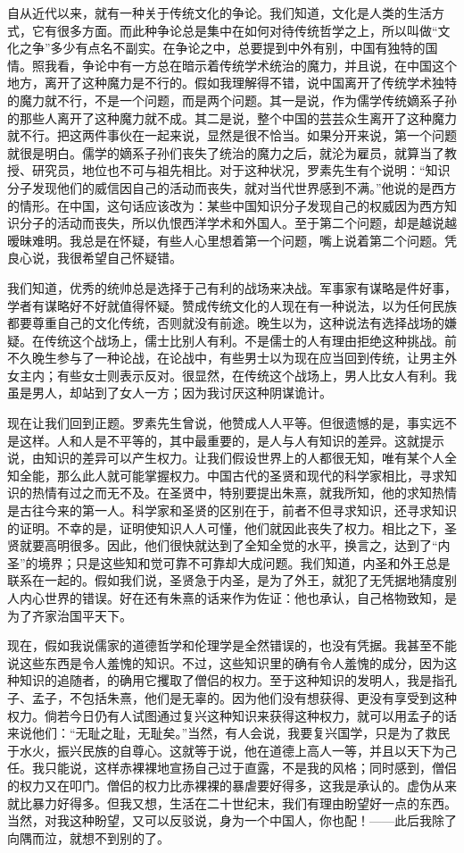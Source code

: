 自从近代以来，就有一种关于传统文化的争论。我们知道，文化是人类的生活方式，它有很多方面。而此种争论总是集中在如何对待传统哲学之上，所以叫做“文化之争”多少有点名不副实。在争论之中，总要提到中外有别，中国有独特的国情。照我看，争论中有一方总在暗示着传统学术统治的魔力，并且说，在中国这个地方，离开了这种魔力是不行的。假如我理解得不错，说中国离开了传统学术独特的魔力就不行，不是一个问题，而是两个问题。其一是说，作为儒学传统嫡系子孙的那些人离开了这种魔力就不成。其二是说，整个中国的芸芸众生离开了这种魔力就不行。把这两件事伙在一起来说，显然是很不恰当。如果分开来说，第一个问题就很是明白。儒学的嫡系子孙们丧失了统治的魔力之后，就沦为雇员，就算当了教授、研究员，地位也不可与祖先相比。对于这种状况，罗素先生有个说明：“知识分子发现他们的威信因自己的活动而丧失，就对当代世界感到不满。”他说的是西方的情形。在中国，这句话应该改为：某些中国知识分子发现自己的权威因为西方知识分子的活动而丧失，所以仇恨西洋学术和外国人。至于第二个问题，却是越说越暧昧难明。我总是在怀疑，有些人心里想着第一个问题，嘴上说着第二个问题。凭良心说，我很希望自己怀疑错。 

我们知道，优秀的统帅总是选择于己有利的战场来决战。军事家有谋略是件好事，学者有谋略好不好就值得怀疑。赞成传统文化的人现在有一种说法，以为任何民族都要尊重自己的文化传统，否则就没有前途。晚生以为，这种说法有选择战场的嫌疑。在传统这个战场上，儒士比别人有利。不是儒士的人有理由拒绝这种挑战。前不久晚生参与了一种论战，在论战中，有些男士以为现在应当回到传统，让男主外女主内；有些女士则表示反对。很显然，在传统这个战场上，男人比女人有利。我虽是男人，却站到了女人一方；因为我讨厌这种阴谋诡计。 

现在让我们回到正题。罗素先生曾说，他赞成人人平等。但很遗憾的是，事实远不是这样。人和人是不平等的，其中最重要的，是人与人有知识的差异。这就提示说，由知识的差异可以产生权力。让我们假设世界上的人都很无知，唯有某个人全知全能，那么此人就可能掌握权力。中国古代的圣贤和现代的科学家相比，寻求知识的热情有过之而无不及。在圣贤中，特别要提出朱熹，就我所知，他的求知热情是古往今来的第一人。科学家和圣贤的区别在于，前者不但寻求知识，还寻求知识的证明。不幸的是，证明使知识人人可懂，他们就因此丧失了权力。相比之下，圣贤就要高明很多。因此，他们很快就达到了全知全觉的水平，换言之，达到了“内圣”的境界；只是这些知和觉可靠不可靠却大成问题。我们知道，内圣和外王总是联系在一起的。假如我们说，圣贤急于内圣，是为了外王，就犯了无凭据地猜度别人内心世界的错误。好在还有朱熹的话来作为佐证：他也承认，自己格物致知，是为了齐家治国平天下。 

现在，假如我说儒家的道德哲学和伦理学是全然错误的，也没有凭据。我甚至不能说这些东西是令人羞愧的知识。不过，这些知识里的确有令人羞愧的成分，因为这种知识的追随者，的确用它攫取了僧侣的权力。至于这种知识的发明人，我是指孔子、孟子，不包括朱熹，他们是无辜的。因为他们没有想获得、更没有享受到这种权力。倘若今日仍有人试图通过复兴这种知识来获得这种权力，就可以用孟子的话来说他们：“无耻之耻，无耻矣。”当然，有人会说，我要复兴国学，只是为了救民于水火，振兴民族的自尊心。这就等于说，他在道德上高人一等，并且以天下为己任。我只能说，这样赤裸裸地宣扬自己过于直露，不是我的风格；同时感到，僧侣的权力又在叩门。僧侣的权力比赤裸裸的暴虐要好得多，这我是承认的。虚伪从来就比暴力好得多。但我又想，生活在二十世纪末，我们有理由盼望好一点的东西。当然，对我这种盼望，又可以反驳说，身为一个中国人，你也配！——此后我除了向隅而泣，就想不到别的了。

